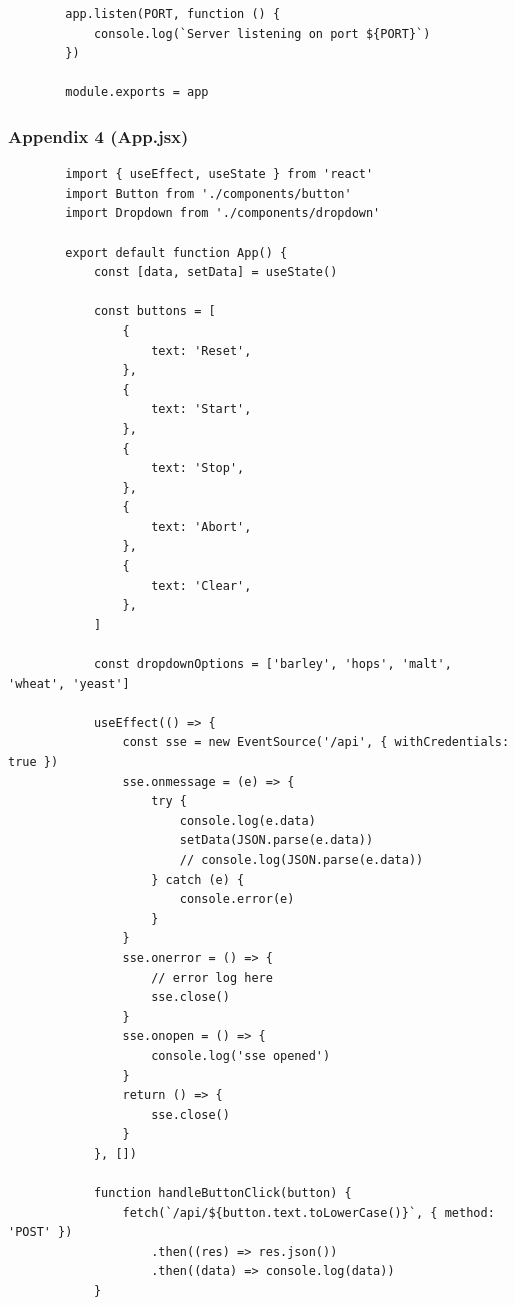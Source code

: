 \begin{center}
\begin{verbatim}
        app.listen(PORT, function () {
            console.log(`Server listening on port ${PORT}`)
        })

        module.exports = app      
    \end{verbatim}
\end{center}

\newpage
\subsubsection{Appendix 4 (App.jsx)}
\begin{center}
    \begin{verbatim}
        import { useEffect, useState } from 'react'
        import Button from './components/button'
        import Dropdown from './components/dropdown'

        export default function App() {
            const [data, setData] = useState()

            const buttons = [
                {
                    text: 'Reset',
                },
                {
                    text: 'Start',
                },
                {
                    text: 'Stop',
                },
                {
                    text: 'Abort',
                },
                {
                    text: 'Clear',
                },
            ]

            const dropdownOptions = ['barley', 'hops', 'malt', 'wheat', 'yeast']

            useEffect(() => {
                const sse = new EventSource('/api', { withCredentials: true })
                sse.onmessage = (e) => {
                    try {
                        console.log(e.data)
                        setData(JSON.parse(e.data))
                        // console.log(JSON.parse(e.data))
                    } catch (e) {
                        console.error(e)
                    }
                }
                sse.onerror = () => {
                    // error log here
                    sse.close()
                }
                sse.onopen = () => {
                    console.log('sse opened')
                }
                return () => {
                    sse.close()
                }
            }, [])

            function handleButtonClick(button) {
                fetch(`/api/${button.text.toLowerCase()}`, { method: 'POST' })
                    .then((res) => res.json())
                    .then((data) => console.log(data))
            }


\end{verbatim}
\end{center}
